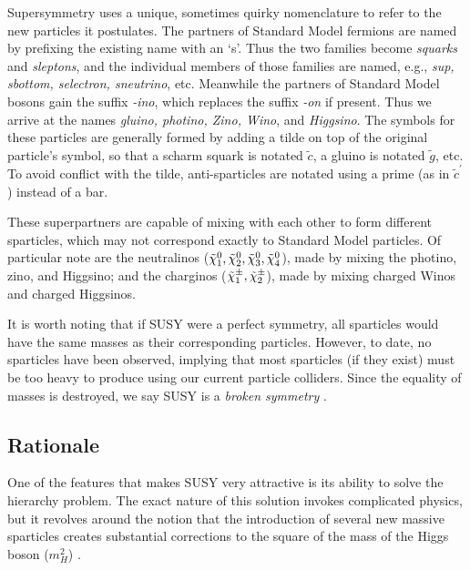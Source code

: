 Supersymmetry uses a unique, sometimes quirky nomenclature to refer to
the new particles it postulates. The partners of Standard Model
fermions are named by prefixing the existing name with an `s'. Thus
the two families become \emph{squarks} and \emph{sleptons}, and the
individual members of those families are named, e.g., \emph{sup,
  sbottom, selectron, sneutrino}, etc. Meanwhile the partners of
Standard Model bosons gain the suffix \emph{-ino}, which replaces the
suffix \emph{-on} if present. Thus we arrive at the names
\emph{gluino, photino, Zino, Wino}, and \emph{Higgsino}. The symbols
for these particles are generally formed by adding a tilde on top of
the original particle's symbol, so that a scharm squark is notated
$\tilde{c}$, a gluino is notated $\tilde{g}$, etc. To avoid conflict
with the tilde, anti-sparticles are notated using a prime (as in
$\tilde{c}^\prime$) instead of a bar.

These superpartners are capable of mixing with each other to form
different sparticles, which may not correspond exactly to Standard
Model particles. Of particular note are the neutralinos
($\tilde{\chi}^0_1, \tilde{\chi}^0_2, \tilde{\chi}^0_3, \tilde{\chi}^0_4$), made by mixing the photino, zino,
and Higgsino; and the charginos ($\tilde{\chi}^\pm_1, \tilde{\chi}^\pm_2$), made by
mixing charged Winos and charged Higgsinos.

It is worth noting that if SUSY were a perfect symmetry, all
sparticles would have the same masses as their corresponding
particles. However, to date, no sparticles have been
observed, implying that most sparticles (if they exist) must be too
heavy to produce using our current particle colliders. Since the
equality of masses is destroyed, we say SUSY is a \emph{broken
symmetry} \cite{susyprimer}.

\subsection{Rationale}
\label{ssec:susyrationale}

One of the features that makes SUSY very attractive is its ability to
solve the hierarchy problem. The exact nature of this solution
invokes complicated physics, but it revolves around
the notion that the introduction of several new massive sparticles
creates substantial corrections to the square of the mass of the
Higgs boson ($m_H^2$) \cite{susyprimer}.

